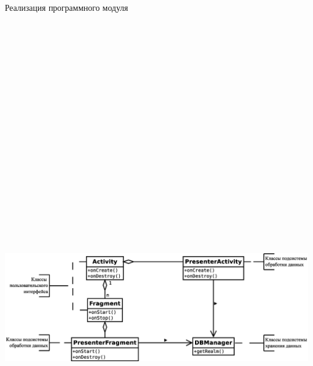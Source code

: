 \documentclass[russian,utf8,a1paper,nostitching,simple]{eskdgraph}
\begin{document}
\begin{ESKDdrawing}
  \centering
  {\fontsize{50}{60}\selectfont Реализация программного модуля}

  \vspace{2cm}
  \centering
   \\
  \vspace{2cm}
  \centering
  \includegraphics[height=24cm]{fig/implementation_bl_presenter_big.eps}



\end{ESKDdrawing}
\end{document}
